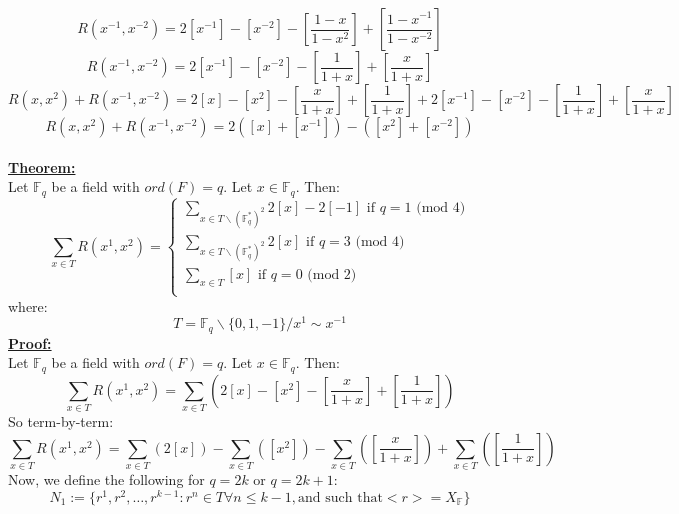 \documentclass[11pt]{article}
\theoremstyle{plain}
\theoremstyle{definition}
\begin{document}
\begin{equation*}
R(x^{-1},x^{-2}) = 2[x^{-1}] - [x^{-2}] - [\frac{1-x}{1-x^{2}}] + [\frac{1-x^{-1}}{1-x^{-2}}]
\end{equation*} 
\begin{equation*}
R(x^{-1},x^{-2}) = 2[x^{-1}] - [x^{-2}] - [\frac{1}{1+x}] + [\frac{x}{1+x}]
\end{equation*} 
\begin{equation*}
R(x,x^2) + R(x^{-1},x^{-2})  = 2[x] - [x^2] - [\frac{x}{1+x}] + [\frac{1}{1+x}] +  2[x^{-1}] - [x^{-2}] - [\frac{1}{1+x}] + [\frac{x}{1+x}]
\end{equation*}
\begin{equation*}
R(x,x^2) + R(x^{-1},x^{-2})  = 2([x] + [x^{-1}]) - ([x^2] + [x^{-2}]) 
\end{equation*}
\\
\textbf{\underline{Theorem:}}\\
Let $\mathbb{F}_q$ be a field with $ord(F) = q$. Let $x \in \mathbb{F}_q$. Then:
\begin{equation}
\sum\limits_{x \in T} R(x^1,x^2)  =  
\begin{cases} 
\sum\limits_{x \in T \backslash (\mathbb{F}_q ^* )^2} 2[x] - 2[-1] \text{ if } q = 1 \text{ (mod } 4)\\
\sum\limits_{x \in T \backslash (\mathbb{F}_q ^* )^2} 2[x]  \text{ if } q = 3 \text{ (mod } 4)\\
 \sum\limits_{x \in T} [x] \text{ if } q = 0 \text{ (mod } 2)\\
\end{cases}
\end{equation}
where:
\begin{equation*}
T=\mathbb{F}_q \backslash \{0,1,-1\} / x^1 \sim x^{-1}
\end{equation*}
\textbf{\underline{Proof:}}\\
Let $\mathbb{F}_q$ be a field with $ord(F) = q$. Let $x \in \mathbb{F}_q$. Then:
\begin{equation*}
\sum\limits_{x \in T} R(x^1,x^2)  =  \sum\limits_{x \in T} (2[x] - [x^2] - [\frac{x}{1+x}] + [\frac{1}{1+x}] )
\end{equation*}
So term-by-term:
\begin{equation*}
\sum\limits_{x \in T} R(x^1,x^2)  =  \sum\limits_{x \in T} (2[x]) - \sum\limits_{x \in T} ([x^2]) - \sum\limits_{x \in T} ([\frac{x}{1+x}]) + \sum\limits_{x \in T} ([\frac{1}{1+x}])
\end{equation*}
Now, we define the following for $q=2k$ or $q=2k+1$:
\begin{equation*}
	N_1 := \{ r^1, r^2, \ldots, r^{k-1} : r^n \in T \forall n \leq k-1, \text{and such that} <r> = X_\mathbb{F} \}
\end{equation*}
\end{document}
